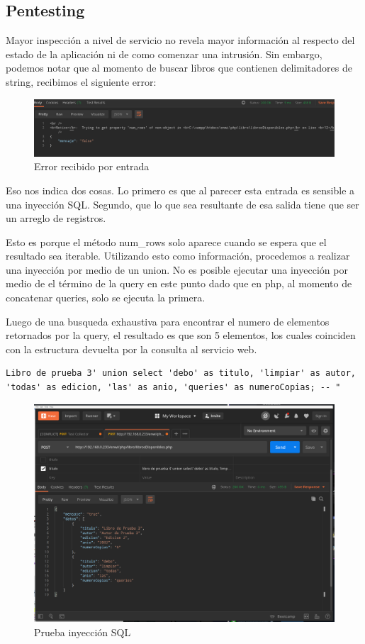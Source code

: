 \subsection{Pentesting}

Mayor inspección a nivel de servicio no revela mayor información al respecto del estado de la aplicación ni de como comenzar una intrusión. Sin embargo, podemos notar que al momento de buscar libros que contienen delimitadores de string, recibimos el siguiente error:


\begin{figure}
	\centering
	\includegraphics[width=.9\textwidth]{fragments/pentest/error1.png}
    \caption{ Error recibido por entrada }
\end{figure}

Eso nos indica dos cosas. Lo primero es que al parecer esta entrada es sensible a una inyección SQL. Segundo, que lo que sea resultante de esa salida tiene que ser un arreglo de registros.

Esto es porque el método num_rows solo aparece cuando se espera que el resultado sea iterable. Utilizando esto como información, procedemos a realizar una inyección por medio de un union. No es posible ejecutar una inyección por medio de el término de la query en este punto dado que en php, al momento de concatenar queries, solo se ejecuta la primera.

Luego de una busqueda exhaustiva para encontrar el numero de elementos retornados por la query, el resultado es que son 5 elementos, los cuales coinciden con la estructura devuelta por la consulta al servicio web.

\begin{verbatim}
Libro de prueba 3' union select 'debo' as titulo, 'limpiar' as autor, 'todas' as edicion, 'las' as anio, 'queries' as numeroCopias; -- "
\end{verbatim}
    

\begin{figure}
	\centering
	\includegraphics[width=.9\textwidth]{fragments/pentest/pen1.png}
    \caption{ Prueba inyección SQL }
\end{figure}

